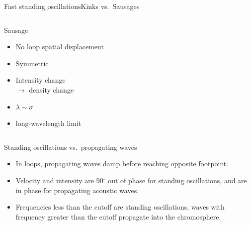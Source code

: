 \documentclass[table]{beamer}
\begin{document}
\begin{frame}[c]{Fast standing oscillations}{Kinks vs.\ Sausages}
\begin{columns}
\begin{block}{Sausage}
            \begin{itemize}
                \item No loop spatial displacement
                \item Symmetric
                \item Intensity change\\ $\rightarrow$ density change
                \item $\lambda\sim\sigma$
                \item long-wavelength limit
            \end{itemize}
        \end{block}
\end{columns}
\end{frame}%
\begin{frame}{Standing oscillations vs.\ propagating waves}
    \begin{itemize}
        \item In loops, propagating waves damp before
            reaching opposite footpoint.
        \item Velocity and intensity are 90$^{\circ}$ out of phase
            for standing oscillations, and are in phase for propagating
            acoustic waves.
        \item Frequencies less than the cutoff are standing oscillations,
            waves with frequency greater than the cutoff propagate into
            the chromosphere.
    \end{itemize}
\end{frame}%
\end{document}
